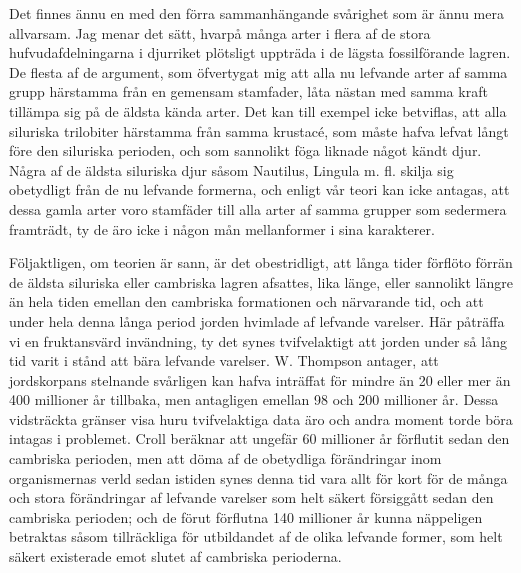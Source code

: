 Det finnes ännu en med den förra sammanhängande svårighet som är ännu mera allvarsam. Jag menar det sätt, hvarpå många arter i flera af de stora hufvudafdelningarna i djurriket plötsligt uppträda i de lägsta fossilförande lagren. De flesta af de argument, som öfvertygat mig att alla nu lefvande arter af samma grupp härstamma från en gemensam stamfader, låta nästan med samma kraft tillämpa sig på de äldsta kända arter. Det kan till exempel icke betviflas, att alla siluriska trilobiter härstamma från samma krustacé, som måste hafva lefvat långt före den siluriska perioden, och som sannolikt föga liknade något kändt djur. Några af de äldsta siluriska djur såsom Nautilus, Lingula m. fl. skilja sig obetydligt från de nu lefvande formerna, och enligt vår teori kan icke antagas, att dessa gamla arter voro stamfäder till alla arter af samma grupper som sedermera framträdt, ty de äro icke i någon mån mellanformer i sina karakterer.

Följaktligen, om teorien är sann, är det obestridligt, att långa tider förflöto förrän de äldsta siluriska eller cambriska lagren afsattes, lika länge, eller sannolikt längre än hela tiden emellan den cambriska formationen och närvarande tid, och att under hela denna långa period jorden hvimlade af lefvande varelser. Här påträffa vi en fruktansvärd invändning, ty det synes tvifvelaktigt att jorden under så lång tid varit i stånd att bära lefvande varelser. W. Thompson antager, att jordskorpans stelnande svårligen kan hafva inträffat för mindre än 20 eller mer än 400 millioner år tillbaka, men antagligen emellan 98 och 200 millioner år. Dessa vidsträckta gränser visa huru tvifvelaktiga data äro och andra moment torde böra intagas i problemet. Croll beräknar att ungefär 60 millioner år förflutit sedan den cambriska perioden, men att döma af de obetydliga förändringar inom organismernas verld sedan istiden synes denna tid vara allt för kort för de många och stora förändringar af lefvande varelser som helt säkert försiggått sedan den cambriska perioden; och de förut förflutna 140 millioner år kunna näppeligen betraktas såsom tillräckliga för utbildandet af de olika lefvande former, som helt säkert existerade emot slutet af cambriska perioderna.

